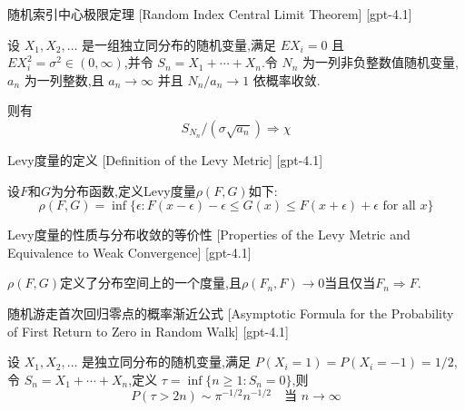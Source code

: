 \documentclass[UTF8]{ctexart}
\begin{document}
    \begin{thm}
        {随机索引中心极限定理}
        [Random Index Central Limit Theorem]
        [gpt-4.1]
        
设 $X_1, X_2, \dots$ 是一组独立同分布的随机变量,满足 $E X_i = 0$ 且 $E X_i^2 = \sigma^2 \in (0, \infty)$,并令 $S_n = X_1 + \cdots + X_n$.令 $N_n$ 为一列非负整数值随机变量,$a_n$ 为一列整数,且 $a_n \to \infty$ 并且 $N_n / a_n \to 1$ 依概率收敛.

则有
\[
S_{N_n} / (\sigma \sqrt{a_n}) \Rightarrow \chi
\]

    \end{thm}
    
    
    
    \begin{dfn}
        {Levy度量的定义}
        [Definition of the Levy Metric]
        [gpt-4.1]
        
设$F$和$G$为分布函数,定义Levy度量$\rho(F, G)$如下:
\[
\rho(F, G) = \inf\{ \epsilon : F(x - \epsilon) - \epsilon \leq G(x) \leq F(x + \epsilon) + \epsilon \text{ for all } x \}
\]

    \end{dfn}
    
    
    
    \begin{thm}
        {Levy度量的性质与分布收敛的等价性}
        [Properties of the Levy Metric and Equivalence to Weak Convergence]
        [gpt-4.1]
        
$\rho(F, G)$定义了分布空间上的一个度量,且$\rho(F_n, F) \to 0$当且仅当$F_n \Rightarrow F$.

    \end{thm}
    
    
    
    \begin{thm}
        {随机游走首次回归零点的概率渐近公式}
        [Asymptotic Formula for the Probability of First Return to Zero in Random Walk]
        [gpt-4.1]
        
设 $X_1, X_2, \dots$ 是独立同分布的随机变量,满足 $P(X_i = 1) = P(X_i = -1) = 1/2$,令 $S_n = X_1 + \cdots + X_n$,定义 $\tau = \operatorname{inf} \{ n \geq 1 : S_n = 0 \}$,则
\[
P(\tau > 2n) \sim \pi^{-1/2} n^{-1/2} \quad \text{当 } n \to \infty
\]

    \end{thm}
    
\end{document}
